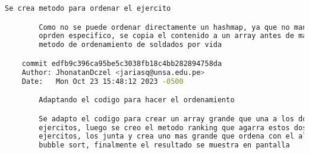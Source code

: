 \begin{lstlisting}[language=bash, caption={commits mas importantes}]
        Se crea metodo para ordenar el ejercito

        Como no se puede ordenar directamente un hashmap, ya que no mantiene un
        oprden especifico, se copia el contenido a un array antes de mandarlo al
        metodo de ordenamiento de soldados por vida

    commit edfb9c396ca95be5c3038fb18c4bb282894758da
    Author: JhonatanDczel <jariasq@unsa.edu.pe>
    Date:   Mon Oct 23 15:48:12 2023 -0500

        Adaptando el codigo para hacer el ordenamiento

        Se adapto el codigo para crear un array grande que una a los dos
        ejercitos, luego se creo el metodo ranking que agarra estos dos
        ejercitos, los junta y crea uno mas grande que ordena con el algoritmo
        bubble sort, finalmente el resultado se muestra en pantalla
\end{lstlisting}
